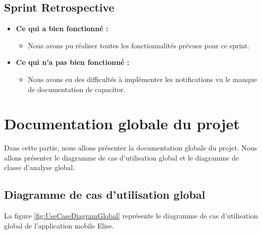 \subsection{Sprint Retrospective}

\begin{itemize}
  \item \textbf{Ce qui a bien fonctionné :}
  \begin{itemize}
    \item Nous avons pu réaliser toutes les fonctionnalités prévues pour ce sprint.
  \end{itemize}

    \item \textbf{Ce qui n'a pas bien fonctionné :}
    \begin{itemize}
      \item Nous avons eu des difficultés à implémenter les notifications vu le manque de documentation de capacitor.
    \end{itemize}
      
\end{itemize}

\section{Documentation globale du projet}

Dans cette partie, nous allons présenter la documentation globale du projet. Nous allons présenter le diagramme de cas d'utilisation global et le diagramme de classe d'analyse global.

\subsection{Diagramme de cas d'utilisation global}
La figure \ref{fig:UseCaseDiagramGlobal} représente le diagramme de cas d'utilisation global de l'application mobile Elise.

